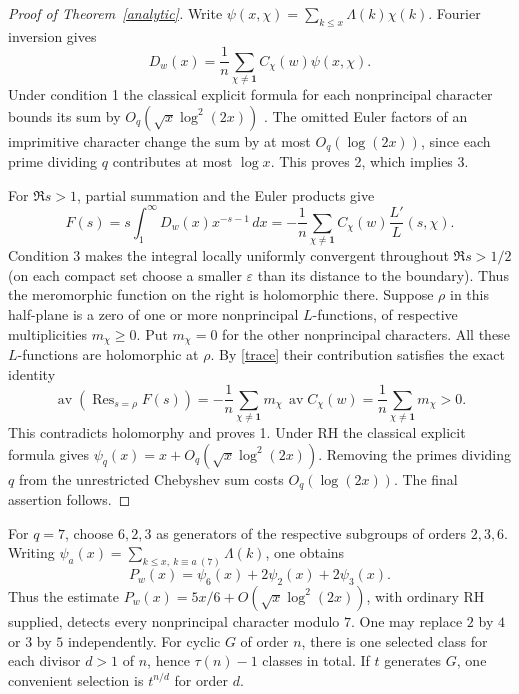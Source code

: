\documentclass[11pt]{article}
\newcommand{\av}{\operatorname{av}}
\newcommand{\Res}{\operatorname{Res}}
\newcommand{\one}{\mathbf{1}}
\newcommand{\pn}{\psi_q}
\begin{document}
\begin{proof}[Proof of Theorem~\ref{analytic}]
Write $\psi(x,\chi)=\sum_{k\le x}\Lambda(k)\chi(k)$. Fourier inversion gives
\[
 D_w(x)=\frac{1}{n}\sum_{\chi\ne\one} C_\chi(w)\psi(x,\chi).
\]
Under condition 1 the classical explicit formula for each nonprincipal character bounds its sum by $O_q(\sqrt x\log^2(2x))$ \cite{ep}. The omitted Euler factors of an imprimitive character change the sum by at most $O_q(\log(2x))$, since each prime dividing $q$ contributes at most $\log x$. This proves 2, which implies 3.

For $\Re s>1$, partial summation and the Euler products give
\begin{equation}\label{mellin}
 F(s)=s\int_1^\infty D_w(x)x^{-s-1}\,dx
 =-\frac1n\sum_{\chi\ne\one} C_\chi(w)\frac{L'}L(s,\chi).
\end{equation}
Condition 3 makes the integral locally uniformly convergent throughout $\Re s>1/2$ (on each compact set choose a smaller $\varepsilon$ than its distance to the boundary). Thus the meromorphic function on the right is holomorphic there. Suppose $\rho$ in this half-plane is a zero of one or more nonprincipal $L$-functions, of respective multiplicities $m_\chi\ge0$. Put $m_\chi=0$ for the other nonprincipal characters. All these $L$-functions are holomorphic at $\rho$. By \eqref{trace} their contribution satisfies the exact identity
\begin{equation}\label{residue}
 \av\!\left(\Res_{s=\rho}F(s)\right)
 =-\frac1n\sum_{\chi\ne\one}m_\chi\,\av C_\chi(w)
 =\frac1n\sum_{\chi\ne\one}m_\chi>0.
\end{equation}
This contradicts holomorphy and proves 1. Under RH the classical explicit formula gives $\pn(x)=x+O_q(\sqrt{x}\log^2(2x))$. Removing the primes dividing $q$ from the unrestricted Chebyshev sum costs $O_q(\log(2x))$. The final assertion follows.
\end{proof}

For $q=7$, choose $6,2,3$ as generators of the respective subgroups of orders $2,3,6$. Writing $\psi_a(x)=\sum_{k\le x,\ k\equiv a\ (7)}\Lambda(k)$, one obtains
\[
 P_w(x)=\psi_6(x)+2\psi_2(x)+2\psi_3(x).
\]
Thus the estimate $P_w(x)=5x/6+O(\sqrt{x}\log^2(2x))$, with ordinary RH supplied, detects every nonprincipal character modulo $7$. One may replace $2$ by $4$ or $3$ by $5$ independently. For cyclic $G$ of order $n$, there is one selected class for each divisor $d>1$ of $n$, hence $\tau(n)-1$ classes in total. If $t$ generates $G$, one convenient selection is $t^{n/d}$ for order $d$.
\end{document}
